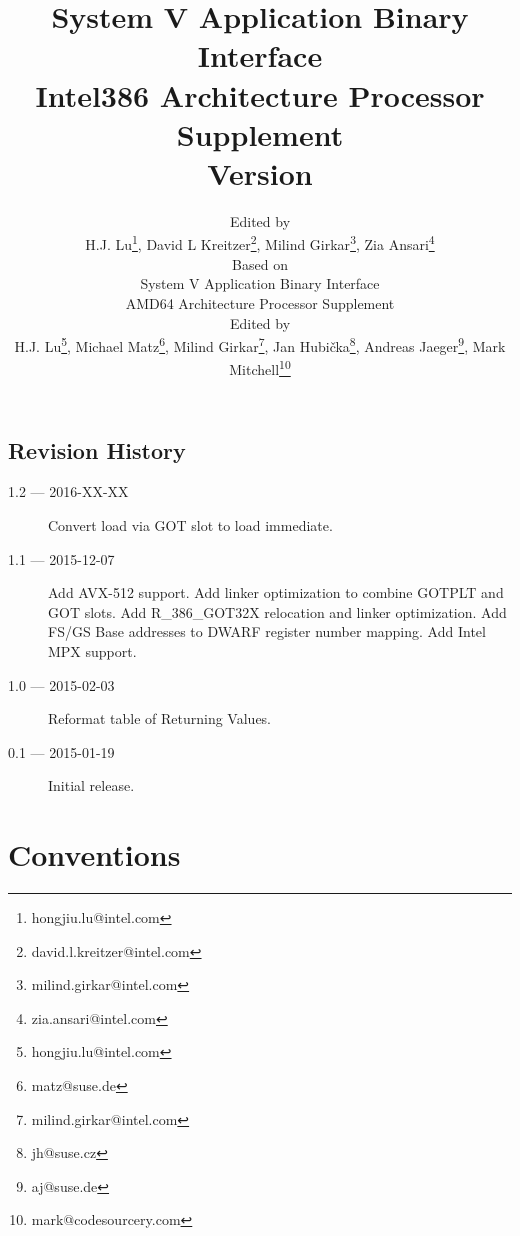 \documentclass[12pt]{report}
\begin{document}
\author{Edited by\\
  H.J. Lu\thanks{hongjiu.lu@intel.com},
  David L Kreitzer\thanks{david.l.kreitzer@intel.com},
  Milind Girkar\thanks{milind.girkar@intel.com},
  Zia Ansari\thanks{zia.ansari@intel.com} \\
  \small
  Based on\\
  \small
  System V Application Binary Interface\\
  \small
  AMD64 Architecture Processor Supplement\\
  \small
  Edited by\\
  \small
  H.J. Lu\thanks{hongjiu.lu@intel.com},
  Michael Matz\thanks{matz@suse.de},
  Milind Girkar\thanks{milind.girkar@intel.com},
  Jan Hubi\v{c}ka\thanks{jh@suse.cz},
  Andreas Jaeger\thanks{aj@suse.de},
  Mark Mitchell\thanks{mark@codesourcery.com}}

\title{System V Application Binary Interface\\
{\Large Intel386 Architecture Processor Supplement\\
Version \version}}
\maketitle
\tableofcontents
\listoftables
\listoffigures

\section*{Revision History}

\begin{description}

\item[1.2 --- 2016-XX-XX] Convert load via GOT slot to load immediate.
\item[1.1 --- 2015-12-07] Add AVX-512 support.  Add linker optimization
to combine GOTPLT and GOT slots.  Add R_386_GOT32X relocation and linker
optimization.  Add FS/GS Base addresses to DWARF register number mapping.
Add Intel MPX support.
\item[1.0 --- 2015-02-03] Reformat table of Returning Values.
\item[0.1 --- 2015-01-19] Initial release.
\end{description}






\chapter{Conventions}



\appendix


\end{document}
